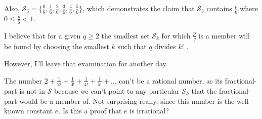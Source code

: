 \documentclass{article}
\begin{document}
Also, \(
\mathcal{S}_3
= \{
\frac{ 0}{6},
\frac{ 1}{6},
\frac{ 2}{6},
\frac{ 3}{6},
\frac{ 4}{6},
\frac{ 5}{6}
\}
\),
which demonstrates the claim that \(\mathcal{S}_3\)
contains \(\frac{p}{6}\),\newline where \(0 \le{} \frac{p}{6} < 1\).

I believe that for a given \(q \ge 2\) the smallest set \(\mathcal{S}_k\) for which \(\frac{p}{q}\)
is a member
will be found by choosing the smallest
\(k\) such that \(q\) divides \(k!\)\! .

However, I'll leave that examination for another day.

The number 
\(2\!+\!\frac{1}{2!}\!+\!\frac{1}{3!}\!+\!\frac{1}{4!}\!+\!\frac{1}{5!}\!+\!\dots{}\) can't
be a rational number, as its fractional-part is not in \(\mathcal{S}\)
because we can't point to any particular \(\mathcal{S}_k\) that the fractional-part would be a member of.
Not surprising really, since this number is the well known constant \(e\).
Is this a proof that \(e\) is irrational?

% 
% 
% 
\end{document}
